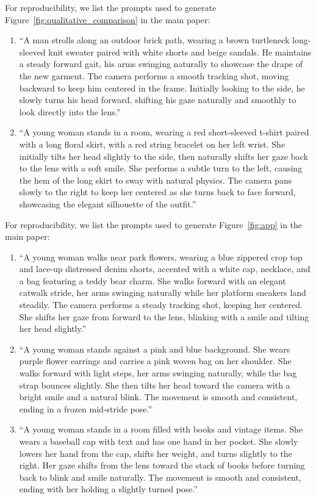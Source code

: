 \documentclass{llmxive}
\begin{document}
For reproducibility, we list the prompts used to generate Figure~\ref{fig:qualitative_comparison} in the main paper:
\begin{enumerate}
\item ``A man strolls along an outdoor brick path, wearing a brown turtleneck long-sleeved knit sweater paired with white shorts and beige sandals. He maintains a steady forward gait, his arms swinging naturally to showcase the drape of the new garment. The camera performs a smooth tracking shot, moving backward to keep him centered in the frame. Initially looking to the side, he slowly turns his head forward, shifting his gaze naturally and smoothly to look directly into the lens.''
% 
\item ``A young woman stands in a room, wearing a red short-sleeved t-shirt paired with a long floral skirt, with a red string bracelet on her left wrist. She initially tilts her head slightly to the side, then naturally shifts her gaze back to the lens with a soft smile. She performs a subtle turn to the left, causing the hem of the long skirt to sway with natural physics. The camera pans slowly to the right to keep her centered as she turns back to face forward, showcasing the elegant silhouette of the outfit.''
\end{enumerate}



For reproducibility, we list the prompts used to generate Figure~\ref{fig:app} in the main paper:
\begin{enumerate}
\item ``A young woman walks near park flowers, wearing a blue zippered crop top and lace-up distressed denim shorts, accented with a white cap, necklace, and a bag featuring a teddy bear charm. She walks forward with an elegant catwalk stride, her arms swinging naturally while her platform sneakers land steadily. The camera performs a steady tracking shot, keeping her centered. She shifts her gaze from forward to the lens, blinking with a smile and tilting her head slightly.''
% 
\item ``A young woman stands against a pink and blue background. She wears purple flower earrings and carries a pink woven bag on her shoulder. She walks forward with light steps, her arms swinging naturally, while the bag strap bounces slightly. She then tilts her head toward the camera with a bright smile and a natural blink. The movement is smooth and consistent, ending in a frozen mid-stride pose.''
% 
\item ``A young woman stands in a room filled with books and vintage items. She wears a baseball cap with text and has one hand in her pocket. She slowly lowers her hand from the cap, shifts her weight, and turns slightly to the right. Her gaze shifts from the lens toward the stack of books before turning back to blink and smile naturally. The movement is smooth and consistent, ending with her holding a slightly turned pose.''
\end{enumerate}
\end{document}
